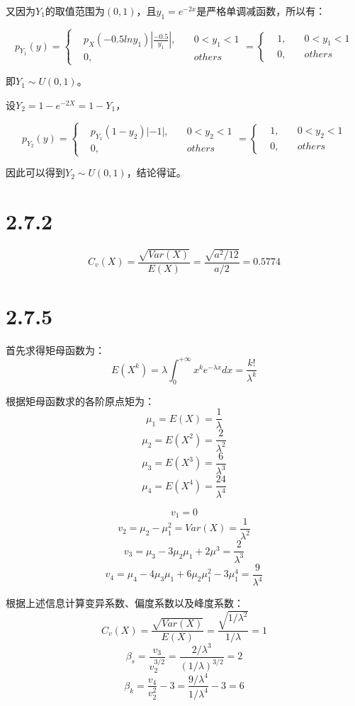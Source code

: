 \documentclass{article}
\begin{document}
又因为$Y_1$的取值范围为$(0,1)$，且$y_1=e^{-2x}$是严格单调减函数，所以有：

\begin{equation}
p_{Y_1}(y)=\left\{
\begin{aligned}
&p_X(-0.5lny_1)|\frac{-0.5}{y_1}|,\quad & 0<y_1<1 \\
&0,\quad & others
\end{aligned}
\right.
=\left\{
\begin{aligned}
&1,\quad & 0<y_1<1 \\
&0,\quad & others
\end{aligned}
\right.
\end{equation}

即$Y_1\sim U(0,1)$。

设$Y_2=1-e^{-2X}=1-Y_1$，

\begin{equation}
p_{Y_2}(y)=\left\{
\begin{aligned}
&p_{Y_1}(1-y_2)|-1|,\quad & 0<y_2<1 \\
&0,\quad & others
\end{aligned}
\right.
=\left\{
\begin{aligned}
&1,\quad & 0<y_2<1 \\
&0,\quad & others
\end{aligned}
\right.
\end{equation}

因此可以得到$Y_2\sim U(0,1)$，结论得证。

\section{2.7.2}
$$C_v(X)=\frac{\sqrt{Var(X)}}{E(X)}=\frac{\sqrt{a^2/12}}{a/2}=0.5774$$
\section{2.7.5}
首先求得矩母函数为：
$$E(X^k)=\lambda \int_0^{+\infty}x^ke^{-\lambda x}dx=\frac{k!}{\lambda^k}$$

根据矩母函数求的各阶原点矩为：
$$\mu_1=E(X)=\frac{1}{\lambda}$$
$$\mu_2=E(X^2)=\frac{2}{\lambda^2}$$
$$\mu_3=E(X^3)=\frac{6}{\lambda^3}$$
$$\mu_4=E(X^4)=\frac{24}{\lambda^4}$$

$$v_1=0$$
$$v_2=\mu_2-\mu_1^2=Var(X)=\frac{1}{\lambda^2}$$
$$v_3=\mu_3-3\mu_2\mu_1+2\mu^3=\frac{2}{\lambda^3}$$
$$v_4=\mu_4-4\mu_3\mu_1+6\mu_2\mu_1^2-3\mu_1^4=\frac{9}{\lambda^4}$$

根据上述信息计算变异系数、偏度系数以及峰度系数：
$$C_v(X)=\frac{\sqrt{Var(X)}}{E(X)}=\frac{\sqrt{1/\lambda^2}}{1/\lambda}=1$$
$$\beta_s=\frac{v_3}{v_2^{3/2}}=\frac{2/\lambda^3}{(1/\lambda)^{3/2}}=2$$
$$\beta_k=\frac{v_4}{v_2^2}-3=\frac{9/\lambda^4}{1/\lambda^4}-3=6$$
\end{document}
